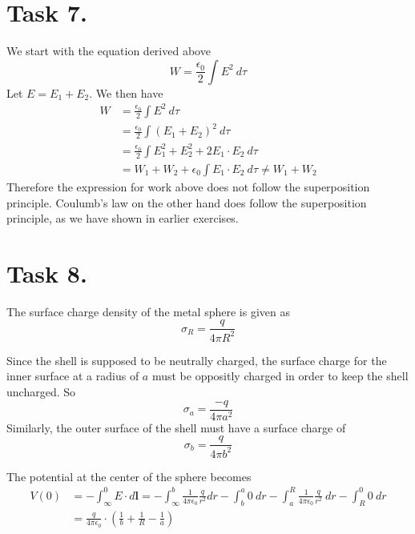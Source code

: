 \documentclass[a4paper,11pt]{article}
\begin{document}
\section*{Task 7.}
We start with the equation derived above
\[
    W = \frac{\epsilon_0}{2} \int E^2 \:d\tau
\]
Let $E = E_1 + E_2$. We then have 
\begin{align*}
    W &= \frac{\epsilon_0}{2} \int E^2 \:d\tau \\ 
      &= \frac{\epsilon_0}{2} \int (E_1 + E_2)^2 \:d\tau \\
      &= \frac{\epsilon_0}{2} \int E_1^2 + E_2^2 + 2E_1 \cdot E_2 \:d\tau \\
      &= W_1 + W_2 + \epsilon_0 \int E_1 \cdot E_2 \:d\tau \neq W_1 + W_2
\end{align*}
Therefore the expression for work above does not follow the superposition principle. Coulumb's law on the
other hand does follow the superposition principle, as we have shown in earlier exercises.

\section*{Task 8.}
\begin{alphalist}
    \item The surface charge density of the metal sphere is given as
        \[
            \sigma_R = \frac{q}{4\pi R^2}
        \]

        Since the shell is supposed to be neutrally charged, the surface charge for the inner surface at a radius of $a$ must be 
        oppositly charged in order to keep the shell uncharged. So
        \[
            \sigma_a = \frac{-q}{4\pi a^2}
        \]
        Similarly, the outer surface of the shell must have a surface charge of
        \[
            \sigma_b = \frac{q}{4\pi b^2}
        \]
    
    \item The potential at the center of the sphere becomes
        \begin{align*}
            V(0) &= -\int_{\infty}^{0} E \cdot d\mathbf{l} = -\int_{\infty}^{b} \frac{1}{4\pi\epsilon_0}\frac{q}{r^2} dr - \int_{b}^{a} 0\: dr - \int_{a}^{R} \frac{1}{4\pi\epsilon_0}\frac{q}{r^2}\:dr - \int_{R}^{0} 0\: dr \\
                 &= \frac{q}{4\pi\epsilon_0} \cdot \left(\frac{1}{b} + \frac{1}{R} - \frac{1}{a}\right)
        \end{align*}

\end{alphalist}
\end{document}
